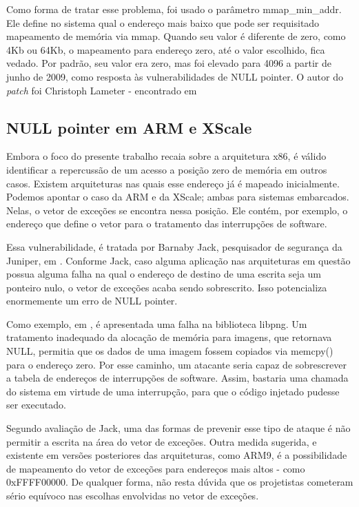 			Como forma de tratar esse problema, foi usado o parâmetro mmap\_min\_addr.
			Ele define no sistema qual o endereço mais baixo que pode ser requisitado mapeamento
			de memória via mmap. Quando seu valor é diferente de zero, como 4Kb ou 64Kb,
			o mapeamento para endereço zero, até o valor escolhido, fica vedado.
			Por padrão, seu valor era zero, mas foi elevado para 4096 a partir de junho de 2009,
			como resposta às vulnerabilidades de NULL pointer.
			O autor do \textsl{patch} foi Christoph Lameter - encontrado em \cite{Lameter2009}
			
			
		\subsection{NULL pointer em ARM e XScale}
		\label{subsec:null_pointer_arm_xscale}
			Embora o foco do presente trabalho recaia sobre a arquitetura x86, é válido 
			identificar a repercussão de um acesso a posição zero de memória em outros casos.
			Existem arquiteturas nas quais esse endereço já é mapeado inicialmente. 
			Podemos apontar o caso da ARM e da XScale; ambas para sistemas embarcados. 
			Nelas, o vetor de exceções se encontra nessa posição. Ele contém, por exemplo,
			o endereço que define o vetor para o tratamento das interrupções de software.


			Essa vulnerabilidade, é tratada por Barnaby Jack, pesquisador de segurança da Juniper,
			em \cite{Jack2007}. Conforme Jack, caso alguma aplicação nas arquiteturas em questão
			possua alguma falha na qual o endereço de destino de uma escrita seja um ponteiro nulo,
			o vetor de exceções acaba sendo sobrescrito. Isso potencializa enormemente um erro
			de NULL pointer.


			Como exemplo, em \cite{Jack2007}, é apresentada uma falha na biblioteca libpng.
			Um tratamento inadequado da alocação de memória para imagens, que
			retornava NULL, permitia que os dados de uma imagem fossem copiados
			via memcpy() para o endereço zero. Por esse caminho, um atacante seria capaz
			de sobrescrever a tabela de endereços de interrupções de software.
			Assim, bastaria uma chamada do sistema em virtude de uma interrupção,
			para que o código injetado pudesse ser executado.

			
			Segundo avaliação de Jack, uma das formas de prevenir esse tipo de ataque é
			não permitir a escrita na área do vetor de exceções. Outra medida sugerida,
			e existente em versões posteriores das arquiteturas, como ARM9, é a possibilidade
			de mapeamento do vetor de exceções para endereços mais altos - como 0xFFFF00000.
			De qualquer forma, não resta dúvida que os projetistas cometeram sério
			equívoco nas escolhas envolvidas no vetor de exceções.
				
